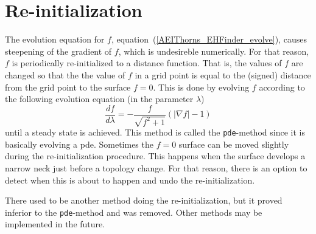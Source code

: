 \section{Re-initialization}
\label{AEIThorns_EHFinder_re_init}
The evolution equation for $f$, 
equation~(\ref{AEIThorns_EHFinder_evolve}), causes steepening of
the gradient of $f$, which is undesireble numerically. For that reason, $f$
is periodically re-initialized to a distance function. That is, the values of
$f$ are changed so that the the value of $f$ in a grid point is equal to the
(signed) distance from the grid point to the surface $f=0$. This is done by
evolving $f$ according to the following evolution equation (in the parameter
$\lambda$)
\begin{equation}
\frac{df}{d\lambda} = -\frac{f}{\sqrt{f^{2}+1}}\left (|\nabla f|-1\right )
\label{AEIThorns_EHFinder_reinit}
\end{equation}
until a steady state is achieved. This method is called the {\tt pde}-method
since it is basically evolving a pde. Sometimes the $f=0$ surface can be
moved slightly during the re-initialization procedure. This happens when
the surface develops a narrow neck just before a topology change. For
that reason, there is an option to detect when this is about to happen and
undo the re-initialization.

There used to be another method doing the re-initialization, but it proved
inferior to the {\tt pde}-method and was removed. Other methods may be
implemented in the future.

